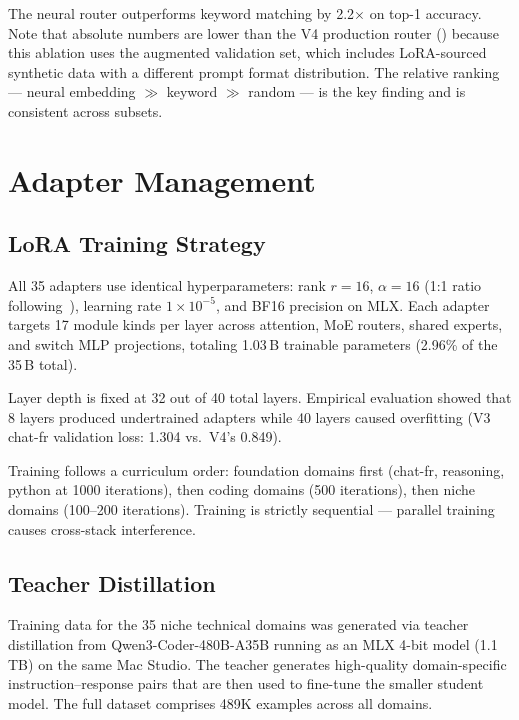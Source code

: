 \documentclass[11pt,a4paper]{article}
\begin{document}
The neural router outperforms keyword matching by 2.2$\times$ on top-1 accuracy. Note that absolute numbers are lower than the V4 production router () because this ablation uses the augmented validation set, which includes LoRA-sourced synthetic data with a different prompt format distribution. The relative ranking --- neural embedding $\gg$ keyword $\gg$ random --- is the key finding and is consistent across subsets.

\section{Adapter Management}
\label{sec:adapters}

\subsection{LoRA Training Strategy}

All 35 adapters use identical hyperparameters: rank $r=16$, $\alpha=16$ (1:1 ratio following~\citet{lora_rank2025}), learning rate $1 \times 10^{-5}$, and BF16 precision on MLX. Each adapter targets 17 module kinds per layer across attention, MoE routers, shared experts, and switch MLP projections, totaling 1.03\,B trainable parameters (2.96\% of the 35\,B total).

Layer depth is fixed at 32 out of 40 total layers. Empirical evaluation showed that 8 layers produced undertrained adapters while 40 layers caused overfitting (V3 chat-fr validation loss: 1.304 vs.\ V4's 0.849).

Training follows a curriculum order: foundation domains first (chat-fr, reasoning, python at 1000 iterations), then coding domains (500 iterations), then niche domains (100--200 iterations). Training is strictly sequential --- parallel training causes cross-stack interference.

\subsection{Teacher Distillation}

Training data for the 35 niche technical domains was generated via teacher distillation from Qwen3-Coder-480B-A35B running as an MLX 4-bit model (1.1\,TB) on the same Mac Studio. The teacher generates high-quality domain-specific instruction--response pairs that are then used to fine-tune the smaller student model. The full dataset comprises 489K examples across all domains.
\end{document}
